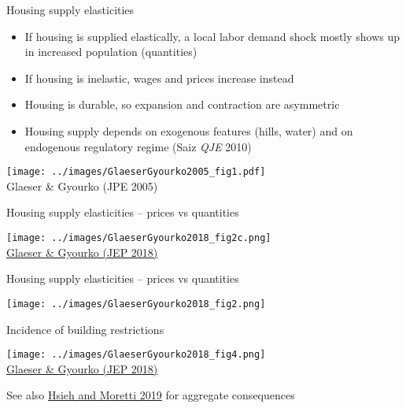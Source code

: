 \documentclass[10pt,notes=hide]{beamer}
\begin{document}
\begin{frame}{Housing supply elasticities}
\begin{itemize}
	\item If housing is supplied elastically, a local labor demand shock mostly shows up in increased population (quantities)
	\item If housing is inelastic, wages and prices increase instead
	\item Housing is durable, so expansion and contraction are asymmetric
	\item Housing supply depends on exogenous features (hills, water) and on endogenous regulatory regime (Saiz \textit{QJE} 2010)
\end{itemize}
\begin{center}
\texttt{[image: ../images/GlaeserGyourko2005\_fig1.pdf]}\\
\vspace{-2mm}
{\small Glaeser \& Gyourko (JPE 2005)}
\end{center}
\end{frame}
\begin{frame}{Housing supply elasticities -- prices vs quantities}
\begin{center}
\texttt{[image: ../images/GlaeserGyourko2018\_fig2c.png]}\\
\href{https://www.aeaweb.org/articles?id=10.1257/jep.32.1.3}{Glaeser \& Gyourko (JEP 2018)}\end{center}
\end{frame}
\begin{frame}{Housing supply elasticities -- prices vs quantities}
\begin{center}
\texttt{[image: ../images/GlaeserGyourko2018\_fig2.png]}
\end{center}
\end{frame}
\begin{frame}{Incidence of building restrictions}
\begin{center}
\texttt{[image: ../images/GlaeserGyourko2018\_fig4.png]}\\
\href{https://www.aeaweb.org/articles?id=10.1257/jep.32.1.3}{Glaeser \& Gyourko (JEP 2018)}
\end{center}
{\small See also \href{https://www.aeaweb.org/articles?id=10.1257/mac.20170388}{Hsieh and Moretti 2019} for aggregate consequences}
\end{frame}
\end{document}
